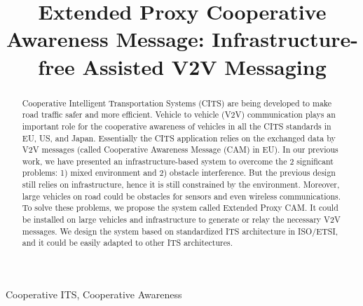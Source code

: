 \documentclass[conference,twocolumn]{IEEEtran}
\begin{document}
\title{Extended Proxy Cooperative Awareness Message: Infrastructure-free Assisted V2V Messaging}
\author{
}

\maketitle

\begin{abstract}
Cooperative Intelligent Transportation Systems
(CITS) are being developed to make road traffic safer and more efficient.
Vehicle to vehicle (V2V) communication plays an important role for the cooperative
awareness of vehicles in all the CITS standards in EU, US, and Japan.
Essentially the CITS application relies on the exchanged data by V2V messages (called Cooperative Awareness Message (CAM) in EU).
In our previous work, we have presented an infrastructure-based system to overcome the 2 significant problems:
1) mixed environment and 2) obstacle interference.
But the previous design still relies on infrastructure, hence it is still constrained by the environment.
Moreover, large vehicles on road could be obstacles for sensors and even wireless communications.
To solve these problems, we propose the system called Extended Proxy CAM.
It could be installed on large vehicles and infrastructure to generate or relay the necessary V2V messages.
We design the system based on standardized ITS architecture in ISO/ETSI, and it could be easily adapted to other ITS architectures.
\end{abstract}

\begin{IEEEkeywords}
Cooperative ITS, Cooperative Awareness
\end{IEEEkeywords}









\end{document}
